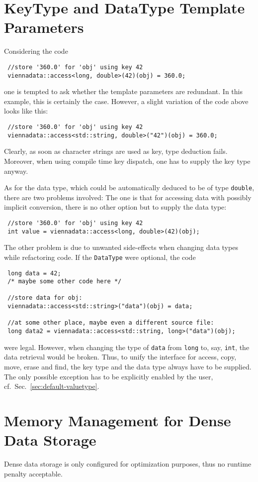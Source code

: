 \section{KeyType and DataType Template Parameters}
Considering the code
\begin{lstlisting}
 //store '360.0' for 'obj' using key 42
 viennadata::access<long, double>(42)(obj) = 360.0;
\end{lstlisting}
one is tempted to ask whether the template parameters are redundant.
In this example, this is certainly the case. However, a slight variation of the code above looks like this:
\begin{lstlisting}
 //store '360.0' for 'obj' using key 42
 viennadata::access<std::string, double>("42")(obj) = 360.0;
\end{lstlisting}
Clearly, as soon as character strings are used as key, type deduction fails. Moreover, when using compile time key dispatch, one has to supply the
key type anyway.

As for the data type, which could be automatically deduced to be of type \lstinline|double|, there are two problems involved:
The one is that for accessing data with possibly implicit conversion, there is no other option but to supply the data type:
\begin{lstlisting}
 //store '360.0' for 'obj' using key 42
 int value = viennadata::access<long, double>(42)(obj);
\end{lstlisting}
The other problem is due to unwanted side-effects when changing data types while refactoring code. If the \lstinline|DataType| were optional, the code
\begin{lstlisting}
 long data = 42;
 /* maybe some other code here */

 //store data for obj:
 viennadata::access<std::string>("data")(obj) = data;

 //at some other place, maybe even a different source file:
 long data2 = viennadata::access<std::string, long>("data")(obj);
\end{lstlisting}
were legal. However, when changing the type of \lstinline|data| from \lstinline|long| to, say, \lstinline|int|, the data retrieval would be broken.
Thus, to unify the interface for access, copy, move, erase and find, the key type and the data type always have to be supplied. 
The only possible exception has to be explicitly enabled by the user, cf.~Sec.~\ref{sec:default-valuetype}.



\section{Memory Management for Dense Data Storage}
Dense data storage is only configured for optimization purposes, thus no runtime penalty acceptable.


